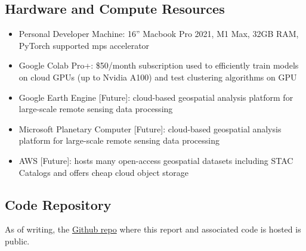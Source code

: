 \begin{multicols}{2}
\subsection{Hardware and Compute Resources}

\begin{itemize}
    \item Personal Developer Machine: 16'' Macbook Pro 2021, M1 Max, 32GB RAM, PyTorch supported mps accelerator
    \item Google Colab Pro+: \$50/month subscription used to efficiently train models on cloud GPUs (up to Nvidia A100) and test clustering algorithms on GPU
    \item Google Earth Engine [Future]: cloud-based geospatial analysis platform for large-scale remote sensing data processing 
    \item Microsoft Planetary Computer [Future]: cloud-based geospatial analysis platform for large-scale remote sensing data processing
    \item AWS [Future]: hosts many open-access geospatial datasets including STAC Catalogs and offers cheap cloud object storage
    
\end{itemize}

\subsection{Code Repository}

As of writing, the \href{https://github.com/avega17/CCOM_MS_Spring_2025_EO_PV_research}{Github repo} where this report and associated code is hosted is public.


\end{multicols}
